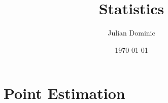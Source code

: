 \documentclass[../setup.tex]{subfiles}
\begin{document}
\title{Statistics}
\author{Julian Dominic}
\date{\today}
\maketitle
\clearpage

\tableofcontents
{}
\clearpage

\setcounter{page}{1}

\section{Point Estimation}
\end{document}
